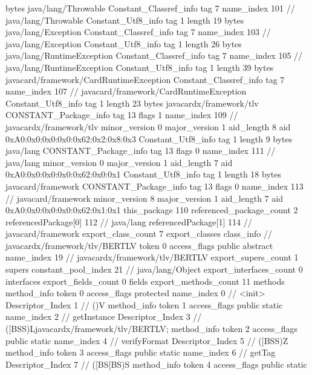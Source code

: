 {{{			bytes	java/lang/Throwable
		}
		Constant_Classref_info {
			tag	7
			name_index	101		// java/lang/Throwable
		}
		Constant_Utf8_info {
			tag	1
			length	19
			bytes	java/lang/Exception
		}
		Constant_Classref_info {
			tag	7
			name_index	103		// java/lang/Exception
		}
		Constant_Utf8_info {
			tag	1
			length	26
			bytes	java/lang/RuntimeException
		}
		Constant_Classref_info {
			tag	7
			name_index	105		// java/lang/RuntimeException
		}
		Constant_Utf8_info {
			tag	1
			length	39
			bytes	javacard/framework/CardRuntimeException
		}
		Constant_Classref_info {
			tag	7
			name_index	107		// javacard/framework/CardRuntimeException
		}
		Constant_Utf8_info {
			tag	1
			length	23
			bytes	javacardx/framework/tlv
		}
		CONSTANT_Package_info {
			tag	13
			flags	1
			name_index	109		// javacardx/framework/tlv
			minor_version	0
			major_version	1
			aid_length	8
			aid	0xA0:0x0:0x0:0x0:0x62:0x2:0x8:0x3
		}
		Constant_Utf8_info {
			tag	1
			length	9
			bytes	java/lang
		}
		CONSTANT_Package_info {
			tag	13
			flags	0
			name_index	111		// java/lang
			minor_version	0
			major_version	1
			aid_length	7
			aid	0xA0:0x0:0x0:0x0:0x62:0x0:0x1
		}
		Constant_Utf8_info {
			tag	1
			length	18
			bytes	javacard/framework
		}
		CONSTANT_Package_info {
			tag	13
			flags	0
			name_index	113		// javacard/framework
			minor_version	8
			major_version	1
			aid_length	7
			aid	0xA0:0x0:0x0:0x0:0x62:0x1:0x1
		}
	}
	this_package	110
	referenced_package_count	2
	referencedPackage[0]	112		// java/lang
	referencedPackage[1]	114		// javacard/framework
	export_class_count	7
	export_classes {
		class_info {		// javacardx/framework/tlv/BERTLV
			token	0
			access_flags	public abstract
			name_index	19		// javacardx/framework/tlv/BERTLV
			export_supers_count	1
			supers {
				constant_pool_index	21		// java/lang/Object
			}
			export_interfaces_count	0
			interfaces {
			}
			export_fields_count	0
			fields {
			}
			export_methods_count	11
			methods {
				method_info {
					token	0
					access_flags	protected
					name_index	0		// <init>
					Descriptor_Index	1		// ()V
				}
				method_info {
					token	1
					access_flags	public static
					name_index	2		// getInstance
					Descriptor_Index	3		// ([BSS)Ljavacardx/framework/tlv/BERTLV;
				}
				method_info {
					token	2
					access_flags	public static
					name_index	4		// verifyFormat
					Descriptor_Index	5		// ([BSS)Z
				}
				method_info {
					token	3
					access_flags	public static
					name_index	6		// getTag
					Descriptor_Index	7		// ([BS[BS)S
				}
				method_info {
					token	4
					access_flags	public static
}}}}}
